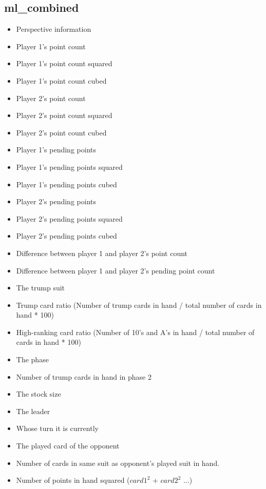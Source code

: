 \documentclass[a4paper,11pt]{article}
\begin{document}
\begin{description}
\subsection{ml\_combined}
\begin{itemize}
\item Perspective information
\item Player 1's point count
\item Player 1's point count squared
\item Player 1's point count cubed
\item Player 2's point count
\item Player 2's point count squared
\item Player 2's point count cubed
\item Player 1's pending points
\item Player 1's pending points squared
\item Player 1's pending points cubed
\item Player 2's pending points
\item Player 2's pending points squared
\item Player 2's pending points cubed
\item Difference between player 1 and player 2's point count
\item Difference between player 1 and player 2's pending point count
\item The trump suit
\item Trump card ratio (Number of trump cards in hand / total number of cards in hand * 100)
\item High-ranking card ratio (Number of 10's and A's in hand / total number of cards in hand * 100)
\item The phase
\item Number of trump cards in hand in phase 2
\item The stock size
\item The leader
\item Whose turn it is currently
\item The played card of the opponent
\item Number of cards in same suit as opponent's played suit in hand.
\item Number of points in hand squared ($card1^2$ + $card2^2$ ...)
\end{itemize}
\end{description}
\end{document}
